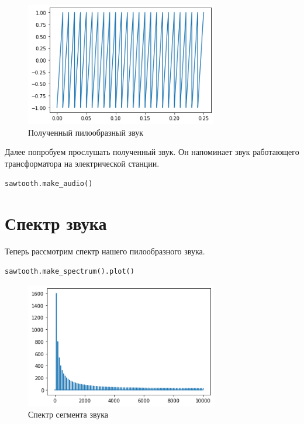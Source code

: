 \documentclass[a4paper,12pt]{report}
\begin{document}
\begin{figure}[H]
        \centering
        \includegraphics[width=0.75\textwidth]{lab2_fig2_1.png}
        \caption{Полученный пилообразный звук}
        \label{fig:lab2_fig2_1}
\end{figure}
    
Далее попробуем прослушать полученный звук. Он напоминает звук работающего трансформатора на электрической станции.

\begin{lstlisting}[caption=Прослушивание звука]
sawtooth.make_audio()
\end{lstlisting}

\section{Спектр звука}

Теперь рассмотрим спектр нашего пилообразного звука.

\begin{lstlisting}[caption=Спектр звука]
sawtooth.make_spectrum().plot()
\end{lstlisting}

\begin{figure}[H]
        \centering
        \includegraphics[width=0.75\textwidth]{lab2_fig2_2.png}
        \caption{Спектр сегмента звука}
        \label{fig:lab2_fig2_2}
\end{figure}
\end{document}
